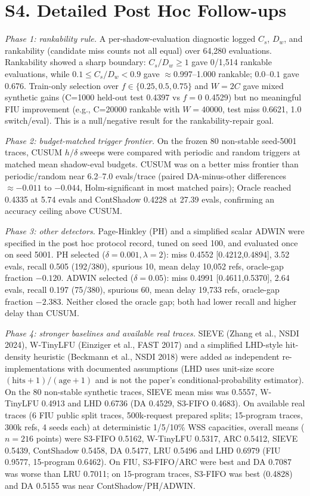 \documentclass[journal,onecolumn]{IEEEtran}
\begin{document}
\section{S4. Detailed Post Hoc Follow-ups}

\emph{Phase 1: rankability rule.} A per-shadow-evaluation diagnostic logged
$C_s$, $D_w$, and rankability (candidate miss counts not all equal) over
64,280 evaluations. Rankability showed a sharp boundary: $C_s/D_w \ge 1$
gave 0/1,514 rankable evaluations, while $0.1 \le C_s/D_w < 0.9$ gave
$\approx$0.997--1.000 rankable; $0.0$--$0.1$ gave 0.676. Train-only
selection over $f\in\{0.25,0.5,0.75\}$ and $W=2C$ gave mixed synthetic
gains (C=1000 held-out test 0.4397 vs $f{=}0$ 0.4529) but no meaningful FIU
improvement (e.g., C=20000 rankable with $W{=}40000$, test miss 0.6621,
1.0 switch/eval). This is a null/negative result for the rankability-repair
goal.

\emph{Phase 2: budget-matched trigger frontier.} On the frozen 80 non-stable
seed-5001 traces, CUSUM $h/\delta$ sweeps were compared with periodic and
random triggers at matched mean shadow-eval budgets. CUSUM was on a better
miss frontier than periodic/random near 6.2--7.0 evals/trace (paired
DA-minus-other differences $\approx -0.011$ to $-0.044$, Holm-significant in
most matched pairs); Oracle reached 0.4335 at 5.74 evals and ContShadow
0.4228 at 27.39 evals, confirming an accuracy ceiling above CUSUM.

\emph{Phase 3: other detectors.} Page-Hinkley (PH) and a simplified scalar
ADWIN were specified in the post hoc protocol record, tuned on seed 100, and evaluated once on seed 5001.
PH selected ($\delta{=}0.001,\lambda{=}2$): miss 0.4552 [0.4212,0.4894],
3.52 evals, recall 0.505 (192/380), spurious 10, mean delay 10,052 refs,
oracle-gap fraction $-0.120$. ADWIN selected ($\delta{=}0.05$): miss 0.4991
[0.4611,0.5370], 2.64 evals, recall 0.197 (75/380), spurious 60, mean delay
19,733 refs, oracle-gap fraction $-2.383$. Neither closed the oracle gap;
both had lower recall and higher delay than CUSUM.

\emph{Phase 4: stronger baselines and available real traces.} SIEVE (Zhang
et al., NSDI 2024), W-TinyLFU (Einziger et al., FAST 2017) and a simplified
LHD-style hit-density heuristic (Beckmann et al., NSDI 2018) were added as
independent re-implementations with documented assumptions (LHD uses unit-size
score $(\text{hits}+1)/(\text{age}+1)$ and is not the paper's
conditional-probability estimator). On the 80 non-stable synthetic traces,
SIEVE mean miss was 0.5557, W-TinyLFU 0.4913 and LHD 0.6736 (DA 0.4529,
S3-FIFO 0.4683). On available real traces (6 FIU public split traces,
500k-request prepared splits; 15-program traces, 300k refs, 4 seeds each) at
deterministic 1/5/10\% WSS capacities, overall means ($n{=}216$ points) were
S3-FIFO 0.5162, W-TinyLFU 0.5317, ARC 0.5412, SIEVE 0.5439, ContShadow 0.5458,
DA 0.5477, LRU 0.5496 and LHD 0.6979 (FIU 0.9577, 15-program 0.6462). On FIU,
S3-FIFO/ARC were best and DA 0.7087 was worse than LRU 0.7011; on 15-program
traces, S3-FIFO was best (0.4828) and DA 0.5155 was near ContShadow/PH/ADWIN.
\end{document}
